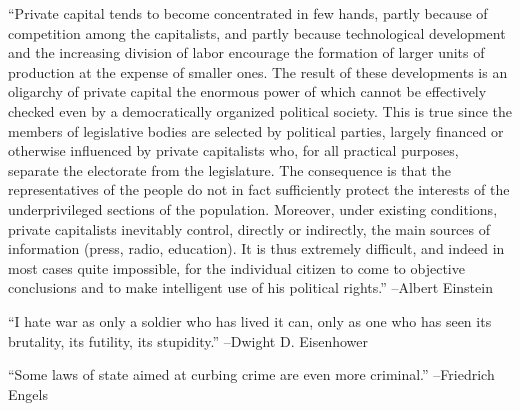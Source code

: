 \documentclass{article}%
\begin{document}
\linebreak%
\vspace{1mm}%
\begin{minipage}{\textwidth}%
\flushleft%
“Private capital tends to become concentrated in few hands, partly because of competition among the capitalists, and partly because technological development and the increasing division of labor encourage the formation of larger units of production at the expense of smaller ones. The result of these developments is an oligarchy of private capital the enormous power of which cannot be effectively checked even by a democratically organized political society. This is true since the members of legislative bodies are selected by political parties, largely financed or otherwise influenced by private capitalists who, for all practical purposes, separate the electorate from the legislature. The consequence is that the representatives of the people do not in fact sufficiently protect the interests of the underprivileged sections of the population. Moreover, under existing conditions, private capitalists inevitably control, directly or indirectly, the main sources of information (press, radio, education). It is thus extremely difficult, and indeed in most cases quite impossible, for the individual citizen to come to objective conclusions and to make intelligent use of his political rights.”%
\linebreak%
\vspace{1mm}%
–Albert Einstein%
\linebreak%
\vspace{1mm}%
\end{minipage}%
\linebreak%
\vspace{1mm}%
\begin{minipage}{\textwidth}%
\flushleft%
“I hate war as only a soldier who has lived it can, only as one who has seen its brutality, its futility, its stupidity.”%
\linebreak%
\vspace{1mm}%
–Dwight D. Eisenhower%
\linebreak%
\vspace{1mm}%
\end{minipage}%
\linebreak%
\vspace{1mm}%
\begin{minipage}{\textwidth}%
\flushleft%
“Some laws of state aimed at curbing crime are even more criminal.”%
\linebreak%
\vspace{1mm}%
–Friedrich Engels%
\linebreak%
\vspace{1mm}%
\end{minipage}%
\end{document}
